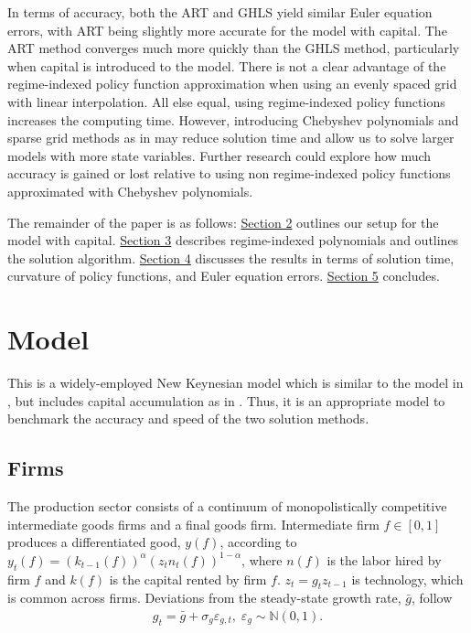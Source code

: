 \documentclass[12pt, final]{article}
\begin{document}

In terms of accuracy, both the ART and GHLS yield similar Euler equation errors, with ART being slightly more accurate for the model with capital. The ART method converges much more quickly than the GHLS method, particularly when capital is introduced to the model. There is not a clear advantage of the regime-indexed policy function approximation when using an evenly spaced grid with linear interpolation. All else equal, using regime-indexed policy functions increases the computing time. However, introducing Chebyshev polynomials and sparse grid methods as in \hyperlink{Gust}{\color{black}{Gust et al.\ (2017)}} may reduce solution time and allow us to solve larger models with more state variables. Further research could explore how much accuracy is gained or lost relative to using non regime-indexed policy functions approximated with Chebyshev polynomials. 

The remainder of the paper is as follows: \hyperlink{Section 2}{Section 2} outlines our setup for the model with capital. \hyperlink{Section 3}{Section 3} describes regime-indexed polynomials and outlines the solution algorithm. \hyperlink{Section 4}{Section 4} discusses the results in terms of solution time, curvature of policy functions, and Euler equation errors. \hyperlink{Section 5}{Section 5} concludes.

\section[Section 2]{Model \hypertarget{Section 2}{}} 
This is a widely-employed New Keynesian model which is similar to the model in \hyperlink{Atkinson}{\color{black}{Atkinson et al.\ (2019)}}, but includes capital accumulation as in \hyperlink{Gust}{\color{black}{Gust et al.\ (2017)}}. Thus, it is an appropriate model to benchmark the accuracy and speed of the two solution methods.

\subsection{Firms} The production sector consists of a continuum of monopolistically competitive intermediate goods firms and a final goods firm. Intermediate firm $f \in [0,1]$ produces a differentiated good, $y(f)$, according to $y_t(f) = (k_{t-1}(f))^\alpha(z_tn_t(f))^{1-\alpha}$, where $n(f)$ is the labor hired by firm $f$ and $k(f)$ is the capital rented by firm $f$. $z_t = g_tz_{t-1}$ is technology, which is common across firms. Deviations from the steady-state growth rate, $\bar{g}$, follow
\begin{gather}
  \label{eq:1}
  g_t = \bar{g} + \sigma_g\varepsilon_{g,t},\; \varepsilon_g \sim \mathds{N}(0,1). 
\end{gather}
\end{document}
